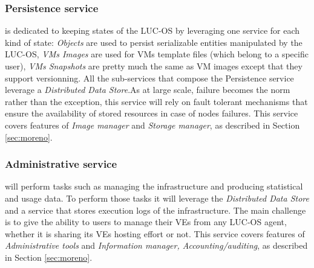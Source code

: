 \subsubsection{Persistence service}
is dedicated to keeping states of the LUC-OS by leveraging one service for each
kind of state: \emph{Objects} are used to persist serializable entities 
manipulated by the LUC-OS, \emph{VMs Images} are used for VMs template files 
(which belong to a specific user), \emph{VMs Snapshots} are pretty much the same
as VM images except that they support versionning. All the sub-services that 
compose the Persistence service leverage a \emph{Distributed Data Store}.As at 
large scale, failure becomes the norm rather than the exception, this service 
will rely on fault tolerant mechanisms that ensure the availability of stored 
resources in case of nodes failures. This service covers features of \emph{Image
manager} and \emph{Storage manager}, as described in Section \ref{sec:moreno}.

\subsubsection{Administrative service} 
will perform tasks such as managing the infrastructure and producing statistical
and usage data. To perform those tasks it will leverage the \emph{Distributed 
Data Store} and a service that stores execution logs of the infrastructure. The 
main challenge is to give the ability to users to manage their VEs from any 
LUC-OS agent, whether it is sharing its VEs hosting effort or not. This service 
covers features of \emph{Administrative tools} and \emph{Information manager,
Accounting/auditing}, as described in Section \ref{sec:moreno}.



